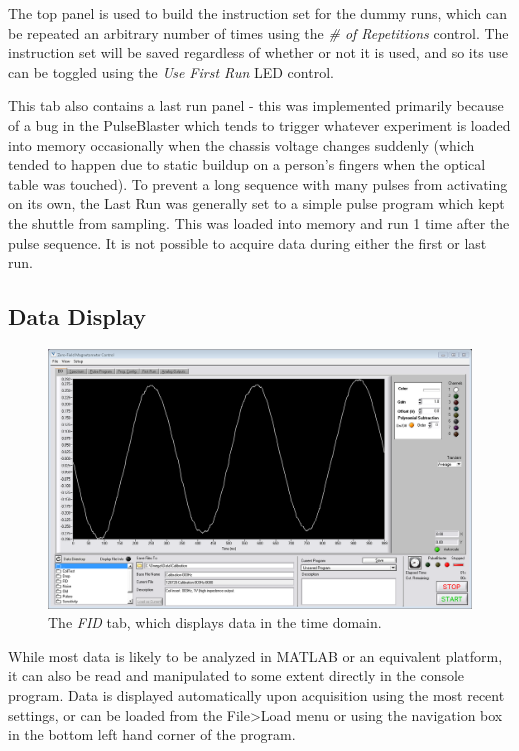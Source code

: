 \documentclass[PaulGanssle-Thesis.tex]{subfiles}
\begin{document}
The top panel is used to build the instruction set for the dummy runs, which can be repeated an arbitrary number of times using the \textit{\# of Repetitions} control. The instruction set will be saved regardless of whether or not it is used, and so its use can be toggled using the \textit{Use First Run} LED control.

This tab also contains a last run panel - this was implemented primarily because of a bug in the PulseBlaster which tends to trigger whatever experiment is loaded into memory occasionally when the chassis voltage changes suddenly (which tended to happen due to static buildup on a person's fingers when the optical table was touched). To prevent a long sequence with many pulses from activating on its own, the Last Run was generally set to a simple pulse program which kept the shuttle from sampling. This was loaded into memory and run 1 time after the pulse sequence. It is not possible to acquire data during either the first or last run.

\subsection{Data Display}
\label{console.software.display}
\begin{figure}[!h]
\includegraphics[width=\textwidth]{figures/console/FIDDisplay1D.png}
\caption{The \textit{FID} tab, which displays data in the time domain.}
\label{fig:FIDDisplay1D}
\end{figure}

While most data is likely to be analyzed in MATLAB or an equivalent platform, it can also be read and manipulated to some extent directly in the console program. Data is displayed automatically upon acquisition using the most recent settings, or can be loaded from the File>Load menu or using the navigation box in the bottom left hand corner of the program.
\end{document}
